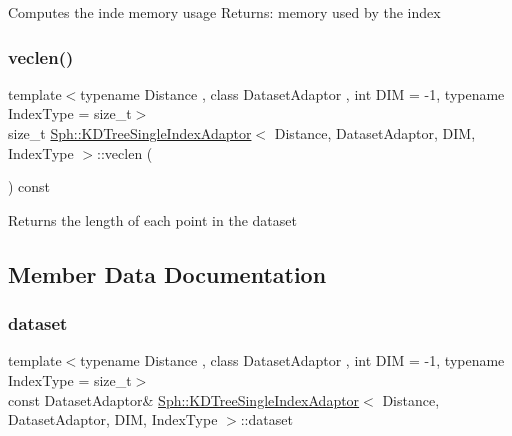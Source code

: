 Computes the inde memory usage Returns\+: memory used by the index \hypertarget{classSph_1_1KDTreeSingleIndexAdaptor_a3bdc53d8655e9e60c52fffc4fc4ce4dc}{}\label{classSph_1_1KDTreeSingleIndexAdaptor_a3bdc53d8655e9e60c52fffc4fc4ce4dc} 
\subsubsection{\texorpdfstring{veclen()}{veclen()}}
{\footnotesize\ttfamily template$<$typename Distance , class Dataset\+Adaptor , int D\+IM = -\/1, typename Index\+Type  = size\+\_\+t$>$ \\
size\+\_\+t \hyperlink{classSph_1_1KDTreeSingleIndexAdaptor}{Sph\+::\+K\+D\+Tree\+Single\+Index\+Adaptor}$<$ Distance, Dataset\+Adaptor, D\+IM, Index\+Type $>$\+::veclen (\begin{DoxyParamCaption}{ }\end{DoxyParamCaption}) const\hspace{0.3cm}{\ttfamily [inline]}}

Returns the length of each point in the dataset 

\subsection{Member Data Documentation}
\hypertarget{classSph_1_1KDTreeSingleIndexAdaptor_a4237e355ab2fc9487e0deb5bb96ad127}{}\label{classSph_1_1KDTreeSingleIndexAdaptor_a4237e355ab2fc9487e0deb5bb96ad127} 
\subsubsection{\texorpdfstring{dataset}{dataset}}
{\footnotesize\ttfamily template$<$typename Distance , class Dataset\+Adaptor , int D\+IM = -\/1, typename Index\+Type  = size\+\_\+t$>$ \\
const Dataset\+Adaptor\& \hyperlink{classSph_1_1KDTreeSingleIndexAdaptor}{Sph\+::\+K\+D\+Tree\+Single\+Index\+Adaptor}$<$ Distance, Dataset\+Adaptor, D\+IM, Index\+Type $>$\+::dataset\hspace{0.3cm}{\ttfamily [protected]}}



